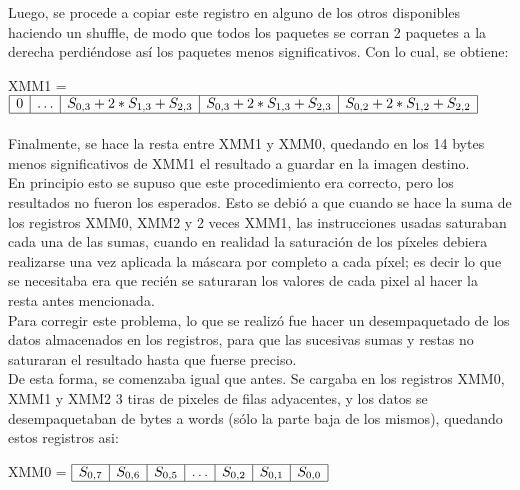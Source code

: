 \documentclass[11pt, a4paper]{article}
\begin{document}
Luego, se procede a copiar este registro en alguno de los otros disponibles haciendo un shuffle, de modo que todos los paquetes se corran 2 paquetes a la derecha perdi\'endose as\'i los paquetes menos significativos. Con lo cual, se obtiene:

\begin{center}
XMM1 = $\begin{array}{|c|c|c|c|c|}
\hline
0 & \ldots & S_{0,3} + 2*S_{1,3} + S_{2,3} & S_{0,3} + 2*S_{1,3} + S_{2,3} & S_{0,2} + 2*S_{1,2} + S_{2,2}\\
\hline
\end{array} $
\end{center}

\paragraph{}
Finalmente, se hace la resta entre XMM1 y XMM0, quedando en los 14 bytes menos significativos de XMM1 el resultado a guardar en la imagen destino.\\

En principio esto se supuso que este procedimiento era correcto, pero los resultados no fueron los esperados. Esto se debi\'o a que cuando se hace la suma de los registros XMM0, XMM2 y 2 veces XMM1, las instrucciones usadas saturaban cada una de las sumas, cuando en realidad la saturaci\'on de los píxeles debiera realizarse una vez aplicada la m\'ascara por completo a cada p\'ixel; es decir lo que se necesitaba era que reci\'en se saturaran los valores de cada pixel al hacer la resta antes mencionada.\\
Para corregir este problema, lo que se realiz\'o fue hacer un desempaquetado de los datos almacenados en los registros, para que las sucesivas sumas y restas no saturaran el resultado hasta que fuerse preciso.\\
De esta forma, se comenzaba igual que antes. Se cargaba en los registros XMM0, XMM1 y XMM2 3 tiras de pixeles de filas adyacentes, y los datos se desempaquetaban de bytes a words (s\'olo la parte baja de los mismos), quedando estos registros asi:

\begin{center}
XMM0 = $\begin{array}{|c|c|c|c|c|c|c|}
\hline
S_{0,7} & S_{0,6} & S_{0,5} & \ldots & S_{0,2} & S_{0,1} & S_{0,0}\\
\hline
\end{array} $
\end{center}
\end{document}
